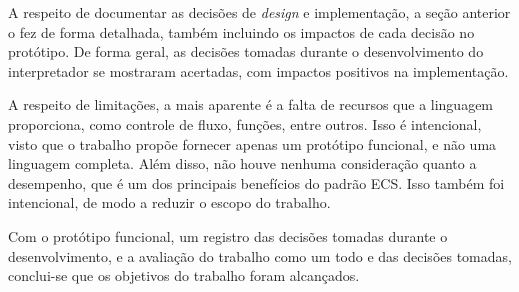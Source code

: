 A respeito de documentar as decisões de \textit{design} e implementação, a seção anterior o fez de forma detalhada, também incluindo os impactos de cada decisão no protótipo. De forma geral, as decisões tomadas durante o desenvolvimento do interpretador se mostraram acertadas, com impactos positivos na implementação.

A respeito de limitações, a mais aparente é a falta de recursos que a linguagem proporciona, como controle de fluxo, funções, entre outros. Isso é intencional, visto que o trabalho propõe fornecer apenas um protótipo funcional, e não uma linguagem completa. Além disso, não houve nenhuma consideração quanto a desempenho, que é um dos principais benefícios do padrão ECS. Isso também foi intencional, de modo a reduzir o escopo do trabalho.

Com o protótipo funcional, um registro das decisões tomadas durante o desenvolvimento, e a avaliação do trabalho como um todo e das decisões tomadas, conclui-se que os objetivos do trabalho foram alcançados.





